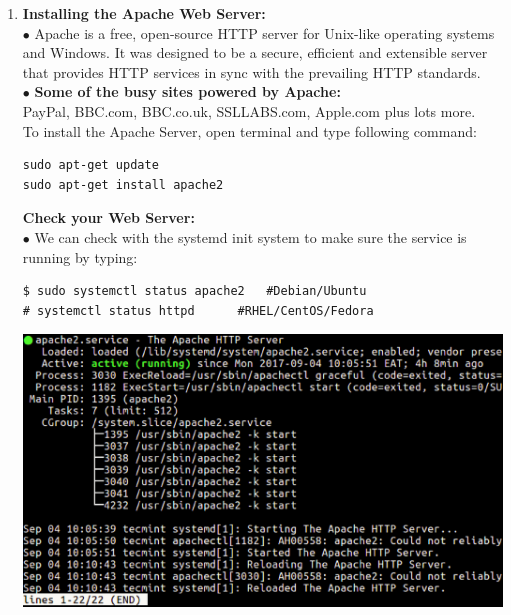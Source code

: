\documentclass[journal,12pt,onecolumn]{IEEEtran}
\begin{document}
\begin{flushleft}
\begin{enumerate}
\item {\textbf{Installing the Apache Web Server:}} \\
$\bullet$ Apache is a free, open-source HTTP server for Unix-like operating systems and Windows. It was designed to be a secure, efficient and extensible server that provides HTTP services in sync with the prevailing HTTP standards.\\
$\bullet$ \textbf{Some of the busy sites powered by Apache:}\\
PayPal, BBC.com, BBC.co.uk, SSLLABS.com, Apple.com plus lots more.\\
\medskip
To install the Apache Server, open terminal and type following command:\\
\medskip
\begin{lstlisting}[frame=single,linewidth=9cm,breaklines=true]
sudo apt-get update
sudo apt-get install apache2
\end{lstlisting}
\bigskip
\textbf{Check your Web Server:} \\
\bigskip
$\bullet$ We can check with the systemd init system to make sure the service is running by typing:\\
\bigskip
\begin{lstlisting}[frame=single,linewidth=15cm,breaklines=true]
$ sudo systemctl status apache2	  #Debian/Ubuntu 
# systemctl status httpd	  #RHEL/CentOS/Fedora 
\end{lstlisting}
\bigskip
\includegraphics[scale=.3]{img6.eps}


\end{enumerate}
\end{flushleft}
\end{document}
